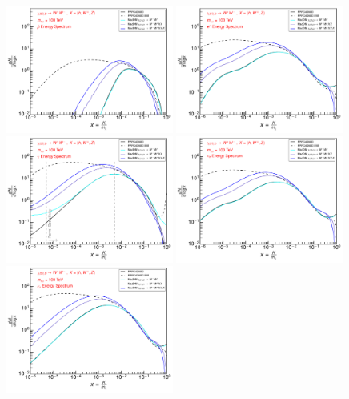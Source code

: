 \documentclass[epj,nopacs,fleqn]{svjour}
\begin{document}
\begin{figure}[!b]
\centering
\subfigure
{ \includegraphics[width=0.49\textwidth]{Fig/100TeV_OLD/OLD_100000_antiprotons_PPPC_Comparison_xdxd_100000.pdf}}
\subfigure
{ \includegraphics[width=0.49\textwidth]{Fig/100TeV_OLD/OLD_100000_positrons_PPPC_Comparison_xdxd_100000.pdf}}
\subfigure
{ \includegraphics[width=0.49\textwidth]{Fig/100TeV_OLD/OLD_100000_gammas_PPPC_Comparison_xdxd_100000.pdf}}
\subfigure
{ \includegraphics[width=0.49\textwidth]{Fig/100TeV_OLD/OLD_100000_neutrinos_e_PPPC_Comparison_xdxd_100000.pdf}}
\subfigure
{ \includegraphics[width=0.49\textwidth]{Fig/100TeV_OLD/OLD_100000_neutrinos_mu_PPPC_Comparison_xdxd_100000.pdf}}

\end{figure}
\end{document}
